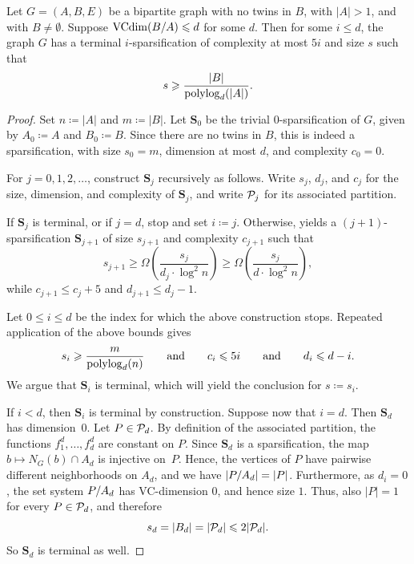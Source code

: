 \begin{lemma}\label{lem:iterate}
  Let $G=(A,B,E)$ be a bipartite graph with no twins in $B$, with
  $|A|>1$, and with $B\neq\emptyset$. 
  Suppose $\VCdim(\inducedSS{B}{A})\le d$ for some $d$.
  Then for some $i\le d$, the graph $G$ has a terminal $i$-sparsification 
  of complexity at most $5i$ 
  and size $s$ such that
  \[
    s\ge \frac{|B|}{\polylog_d(|A|)}.
  \]
\end{lemma}
\begin{proof}
  Set $n\coloneqq|A|$ and $m\coloneqq|B|$.
Let $\mathbf S_0$ be the trivial $0$-sparsification of $G$, given by
$A_0\coloneqq A$ and $B_0\coloneqq B$.
Since there are no twins in $B$, this is indeed a sparsification, with
size $s_0=m$, dimension at most $d$, and complexity $c_0=0$.

For $j=0,1,2,\ldots$, construct $\mathbf S_j$ recursively as follows.
Write $s_j$, $d_j$, and $c_j$ for the size, dimension, and
complexity of $\mathbf S_j$, and write $\cal P_j$ for its associated
partition.

If $\mathbf S_j$ is terminal, or if $j=d$, stop and set $i\coloneqq j$.
Otherwise,  yields a $(j+1)$-sparsification
$\mathbf S_{j+1}$ of size $s_{j+1}$ and complexity $c_{j+1}$ such that
\[
  s_{j+1}
  \ge \Omega\left(\frac{s_j}{d_j\cdot \log^2 n}\right)
  \ge \Omega\left(\frac{s_j}{d\cdot \log^2 n}\right),
\]
while $c_{j+1}\le c_j+5$ and $d_{j+1}\le d_j-1$.

Let $0 \leq i \leq d$ be the index for which the above construction stops.
Repeated application of the above bounds
gives
\[
  s_i\ge \frac{m}{\polylog_d(n)}
  \qquad\text{and}\qquad
  c_i\le 5i\qquad\text{and}\qquad d_i\le d-i.
\]
We argue that $\mathbf S_i$ is terminal,
which will yield the conclusion for $s\coloneqq s_i$.

If $i<d$, then $\mathbf S_i$ is terminal by construction.
Suppose now that $i=d$.
Then $\mathbf S_d$ has dimension~$0$.
Let $P\in\cal P_d$.
By definition of the associated partition, the functions
$f^d_1,\ldots,f^d_d$ are constant on $P$.
Since $\mathbf S_d$ is a sparsification, the map
$b\mapsto N_G(b)\cap A_d$ is injective on~$P$. 
Hence, the vertices of $P$ have pairwise different neighborhoods on $A_d$, and we have $|\inducedSS{P}{A_d}| = |P|$.
Furthermore, as $d_i=0$, the set system $\inducedSS{P}{A_d}$ has VC-dimension $0$,
and hence size $1$.
Thus, also $|P|=1$ for every $P\in\cal P_d$, and therefore
\[
  s_d=|B_d|=|\cal P_d|\le 2|\cal P_d|.
\]
So $\mathbf S_d$ is terminal as well.
\end{proof}


